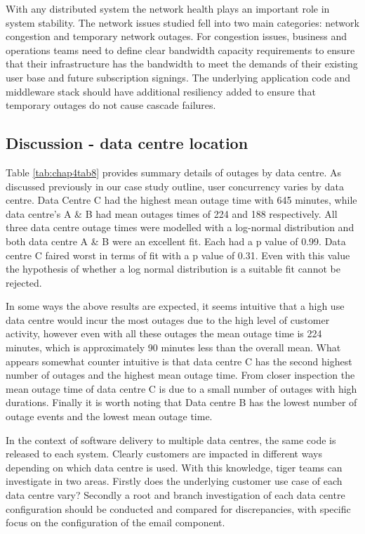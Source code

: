 With any distributed system the network health plays an important role in system stability. The network issues studied fell into two main categories: network congestion and temporary network outages. For congestion issues, business and operations teams need to define clear bandwidth capacity requirements to ensure that their infrastructure has the bandwidth to meet the demands of their existing user base and future subscription signings. The underlying application code and middleware stack should have additional resiliency added to ensure that temporary outages do not cause cascade failures.  \par

\subsection{Discussion - data centre location}

Table \ref{tab:chap4tab8} provides summary details of outages by data centre. As discussed previously in our case study outline, user concurrency varies by data centre. Data Centre C had the highest mean outage time with 645 minutes, while data centre's A \& B had mean outages times of 224 and 188 respectively. All three data centre outage times were modelled with a log-normal distribution and both data centre A \& B were an excellent fit. Each had a  p value of 0.99. Data centre C faired worst in terms of fit with a p value of 0.31. Even with this value the hypothesis of whether a log normal distribution is a suitable fit cannot be rejected. \par

In some ways the above results are expected, it seems intuitive that a high use data centre would incur the most outages due to the high level of customer activity, however even with all these outages the mean outage time is 224 minutes, which is approximately 90 minutes less than the overall mean. What appears somewhat counter intuitive is that data centre C has the second highest number of outages and the highest mean outage time. From closer inspection the mean outage time of data centre C is due to a small number of outages with high durations. Finally it is worth noting that Data centre B has the lowest number of outage events and the lowest mean outage time.\par

In the context of software delivery to multiple data centres, the same code is released to each system. Clearly customers are impacted in different ways depending on which data centre is used. With this knowledge, tiger teams can investigate in two areas. Firstly does the underlying customer use case of each data centre vary? Secondly a root and branch investigation of each data centre configuration should be conducted and compared for discrepancies, with specific focus on the configuration of the email component. \par


